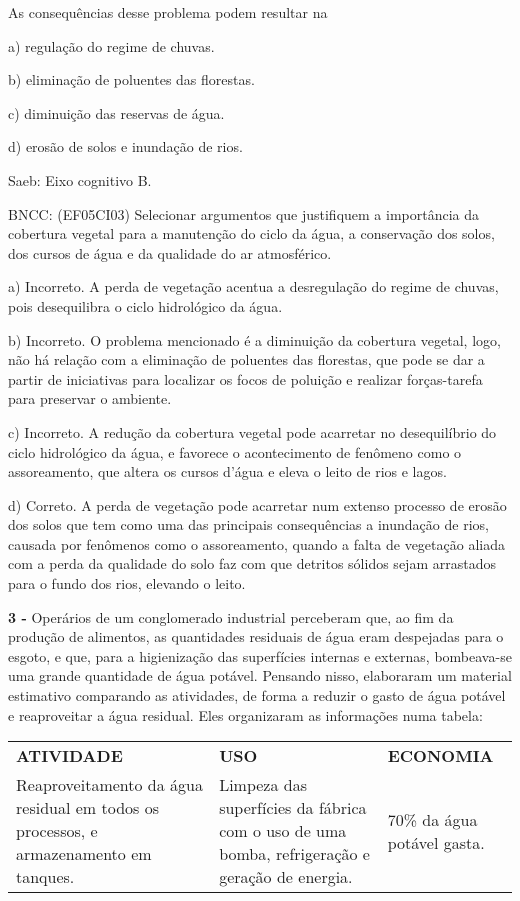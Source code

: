 As consequências desse problema podem resultar na

a) regulação do regime de chuvas.

b) eliminação de poluentes das florestas.

c) diminuição das reservas de água.

d) erosão de solos e inundação de rios.

Saeb: Eixo cognitivo B.

BNCC: (EF05CI03) Selecionar argumentos que justifiquem a importância da
cobertura vegetal para a manutenção do ciclo da água, a conservação dos
solos, dos cursos de água e da qualidade do ar atmosférico.

a) Incorreto. A perda de vegetação acentua a desregulação do regime de
chuvas, pois desequilibra o ciclo hidrológico da água.

b) Incorreto. O problema mencionado é a diminuição da cobertura vegetal,
logo, não há relação com a eliminação de poluentes das florestas, que
pode se dar a partir de iniciativas para localizar os focos de poluição
e realizar forças-tarefa para preservar o ambiente.

c) Incorreto. A redução da cobertura vegetal pode acarretar no
desequilíbrio do ciclo hidrológico da água, e favorece o acontecimento
de fenômeno como o assoreamento, que altera os cursos d'água e eleva o
leito de rios e lagos.

d) Correto. A perda de vegetação pode acarretar num extenso processo de
erosão dos solos que tem como uma das principais consequências a
inundação de rios, causada por fenômenos como o assoreamento, quando a
falta de vegetação aliada com a perda da qualidade do solo faz com que
detritos sólidos sejam arrastados para o fundo dos rios, elevando o
leito.

\textbf{3 -} Operários de um conglomerado industrial perceberam que, ao
fim da produção de alimentos, as quantidades residuais de água eram
despejadas para o esgoto, e que, para a higienização das superfícies
internas e externas, bombeava-se uma grande quantidade de água potável.
Pensando nisso, elaboraram um material estimativo comparando as
atividades, de forma a reduzir o gasto de água potável e reaproveitar a
água residual. Eles organizaram as informações numa tabela:

\begin{longtable}[]{@{}lll@{}}
\toprule
\textbf{ATIVIDADE} & \textbf{USO} & \textbf{ECONOMIA}\tabularnewline
Reaproveitamento da água residual em todos os processos, e armazenamento
em tanques. & Limpeza das superfícies da fábrica com o uso de uma bomba,
refrigeração e geração de energia. & 70\% da água potável
gasta.\tabularnewline
\bottomrule
\end{longtable}

